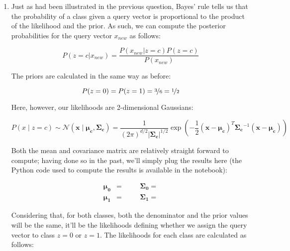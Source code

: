 \documentclass[12pt]{article}
\begin{document}
\begin{enumerate}[leftmargin=\labelsep]
        \begin{enumerate}
          \item {
                Just as had been illustrated in the previous question, Bayes' rule tells
                us that the probability of a class given a query vector is proportional to
                the product of the likelihood and the prior. As such, we can compute the
                posterior probabilities for the query vector $x_{new}$ as follows:

                $$
                  P(z = c | x_{new}) = \frac{P(x_{new} | z = c) P(z = c)}{P(x_{new})}
                $$

                The priors are calculated in the same way as before:

                $$
                  P(z = 0) = P(z = 1) = \nicefrac{3}{6} = \nicefrac{1}{2}
                $$

                Here, however, our likelihoods are 2-dimensional Gaussians:

                $$
                  P(x \mid z = c) \sim
                  \mathcal{N}(\boldsymbol{x} \mid \boldsymbol{\mu_c}, \boldsymbol{\Sigma_c}) =
                  \frac{1}{(2\pi)^{d/2}|\boldsymbol{\Sigma_c}|^{1/2}}
                  \exp\left(-\frac{1}{2}(\boldsymbol{x} - \boldsymbol{\mu_c})^T
                  \boldsymbol{\Sigma_c}^{-1}(\boldsymbol{x} - \boldsymbol{\mu_c})\right)
                $$

                Both the mean and covariance matrix are relatively straight forward
                to compute; having done so in the past, we'll simply plug the
                results here (the Python code used to compute the results is
                available in the notebook):

                \begin{align*}
                  \boldsymbol{\mu_0} & =  \quad
                                     &                                            & \boldsymbol{\Sigma_0} =  \\
                  \boldsymbol{\mu_1} & =  \quad
                                     &                                            & \boldsymbol{\Sigma_1} = 
                \end{align*}

                Considering that, for both classes, both the denominator and the prior
                values will be the same, it'll be the likelihoods defining whether
                we assign the query vector to class $z=0$ or $z=1$. The likelihoods
                for each class are calculated as follows:

}
\end{enumerate}
\end{enumerate}
\end{document}
